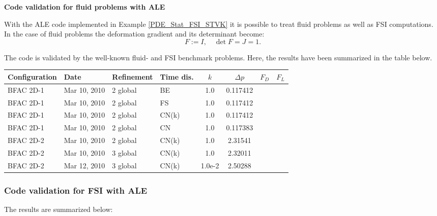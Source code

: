 {\bf Code validation for fluid problems with ALE}

With the ALE code implemented in Example 
\ref{PDE_Stat_FSI_STVK} it is possible to treat fluid 
problems as well as FSI computations. 
In the case of fluid problems the deformation
gradient and its determinant become:
\begin{equation*}
F:= I , \quad \det F = J = 1.
\end{equation*}

The code is validated by the well-known 
fluid- and FSI benchmark problems. Here, 
the results have been summarized in the table below.

 \begin{table}[h]
   \small
   \centering
     \begin{tabular}{llllcccc}    
       \hline
       Configuration & Date         & Refinement & Time dis. & $k$ & $\Delta p$& $F_D$ & $F_L$   \\ \hline\hline
       BFAC 2D-1     & Mar 10, 2010 & 2 global   & BE        & 1.0    & 0.117412  &       &         \\
       BFAC 2D-1     & Mar 10, 2010 & 2 global   & FS        & 1.0    & 0.117412  &       &         \\
       BFAC 2D-1     & Mar 10, 2010 & 2 global   & CN(k)     & 1.0    & 0.117412  &       &         \\ 
       BFAC 2D-1     & Mar 10, 2010 & 2 global   & CN        & 1.0    & 0.117383  &       &         \\ 
       BFAC 2D-2     & Mar 10, 2010 & 2 global   & CN(k)     & 1.0    & 2.31541   &       &         \\ 
       BFAC 2D-2     & Mar 10, 2010 & 3 global   & CN(k)     & 1.0    & 2.32011   &       &         \\   
       BFAC 2D-2     & Mar 12, 2010 & 3 global   & CN(k)     & 1.0e-2 & 2.50288   &       &         \\   
     \end{tabular}
  \end{table}
 
\subsubsection{Code validation for FSI with ALE}

The results are summarized below:

